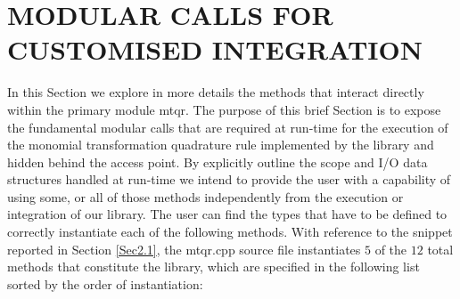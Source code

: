 \documentclass[a4paper, twosided]{book}
\begin{document}
\newpage
{}

\section[Modular calls for customised integration]{\changefont MODULAR CALLS FOR CUSTOMISED INTEGRATION}\label{Sec3.4}

\noindent
In this Section we explore in more details the methods that interact directly within the primary module \colorbox{poliGrayBlue}{mtqr}. The purpose of this brief Section is to expose the fundamental modular calls that are required at run-time for the execution of the monomial transformation quadrature rule implemented by the library and hidden behind the access point. By explicitly outline the scope and I/O data structures handled at run-time we intend to provide the user with a capability of using some, or all of those methods independently from the execution or integration of our library. The user can find the types that have to be defined to correctly instantiate each of the following methods. With reference to the snippet reported in Section \ref{Sec2.1}, the \colorbox{poliGrayBlue}{mtqr.cpp} source file instantiates $5$ of the $12$ total methods that constitute the library, which are specified in the following list sorted by the order of instantiation:
\end{document}
